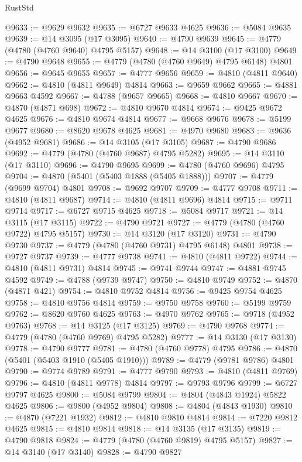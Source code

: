 \begin{lexlean}{RustStd}
\begin{coremodule}
@9633 := @9629 @9632
@9635 := @6727 @9633 @4625
@9636 := @5084 @9635
@9639 := @14 @3095 (@17 @3095)
@9640 := @4790 @9639
@9645 := @4779 (@4780 (@4760 @9640) @4795 @5157)
@9648 := @14 @3100 (@17 @3100)
@9649 := @4790 @9648
@9655 := @4779 (@4780 (@4760 @9649) @4795 @6148) @4801
@9656 := @9645 @9655
@9657 := @4777 @9656
@9659 := @4810 (@4811 @9640)
@9662 := @4810 (@4811 @9649) @4814
@9663 := @9659 @9662
@9665 := @4881 @9663 @4592
@9667 := @4788 (@9657 @9665)
@9668 := @4810 @9667
@9670 := @4870 (@4871 @698)
@9672 := @4810 @9670 @4814
@9674 := @9425 @9672 @4625
@9676 := @4810 @9674 @4814
@9677 := @9668 @9676
@9678 := @5199 @9677
@9680 := @8620 @9678 @4625
@9681 := @4970 @9680
@9683 := @9636 (@4952 @9681)
@9686 := @14 @3105 (@17 @3105)
@9687 := @4790 @9686
@9692 := @4779 (@4780 (@4760 @9687) @4795 @5282)
@9695 := @14 @3110 (@17 @3110)
@9696 := @4790 @9695
@9699 := @4780 (@4760 @9696) @4795
@9704 := @4870 (@5401 (@5403 @1888 (@5405 @1888)))
@9707 := @4779 (@9699 @9704) @4801
@9708 := @9692 @9707
@9709 := @4777 @9708
@9711 := @4810 (@4811 @9687)
@9714 := @4810 (@4811 @9696) @4814
@9715 := @9711 @9714
@9717 := @6727 @9715 @4625
@9718 := @5084 @9717
@9721 := @14 @3115 (@17 @3115)
@9722 := @4790 @9721
@9727 := @4779 (@4780 (@4760 @9722) @4795 @5157)
@9730 := @14 @3120 (@17 @3120)
@9731 := @4790 @9730
@9737 := @4779 (@4780 (@4760 @9731) @4795 @6148) @4801
@9738 := @9727 @9737
@9739 := @4777 @9738
@9741 := @4810 (@4811 @9722)
@9744 := @4810 (@4811 @9731) @4814
@9745 := @9741 @9744
@9747 := @4881 @9745 @4592
@9749 := @4788 (@9739 @9747)
@9750 := @4810 @9749
@9752 := @4870 (@4871 @421)
@9754 := @4810 @9752 @4814
@9756 := @9425 @9754 @4625
@9758 := @4810 @9756 @4814
@9759 := @9750 @9758
@9760 := @5199 @9759
@9762 := @8620 @9760 @4625
@9763 := @4970 @9762
@9765 := @9718 (@4952 @9763)
@9768 := @14 @3125 (@17 @3125)
@9769 := @4790 @9768
@9774 := @4779 (@4780 (@4760 @9769) @4795 @5282)
@9777 := @14 @3130 (@17 @3130)
@9778 := @4790 @9777
@9781 := @4780 (@4760 @9778) @4795
@9786 := @4870 (@5401 (@5403 @1910 (@5405 @1910)))
@9789 := @4779 (@9781 @9786) @4801
@9790 := @9774 @9789
@9791 := @4777 @9790
@9793 := @4810 (@4811 @9769)
@9796 := @4810 (@4811 @9778) @4814
@9797 := @9793 @9796
@9799 := @6727 @9797 @4625
@9800 := @5084 @9799
@9804 := @4804 (@4843 @1924) @5822 @4625
@9806 := @9800 (@4952 @9804)
@9808 := @4804 (@4843 @1930)
@9810 := @4870 (@7221 @1932)
@9812 := @4810 @9810 @4814
@9814 := @7220 @9812 @4625
@9815 := @4810 @9814
@9818 := @14 @3135 (@17 @3135)
@9819 := @4790 @9818
@9824 := @4779 (@4780 (@4760 @9819) @4795 @5157)
@9827 := @14 @3140 (@17 @3140)
@9828 := @4790 @9827

\end{coremodule}
\end{lexlean}
